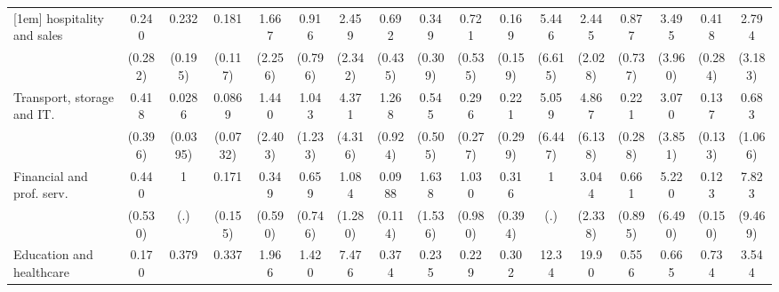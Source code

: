 {\begin{tabular}{l*{16}{c}}
[1em]
hospitality and sales&       0.240         &       0.232         &       0.181\sym{**} &       1.667         &       0.916         &       2.459         &       0.692         &       0.349         &       0.721         &       0.169         &       5.446         &       2.445         &       0.877         &       3.495         &       0.418         &       2.794         \\
                    &     (0.282)         &     (0.195)         &     (0.117)         &     (2.256)         &     (0.796)         &     (2.342)         &     (0.435)         &     (0.309)         &     (0.535)         &     (0.159)         &     (6.615)         &     (2.028)         &     (0.737)         &     (3.960)         &     (0.284)         &     (3.183)         \\
[1em]
Transport, storage and IT.&       0.418         &      0.0286\sym{*}  &      0.0869\sym{**} &       1.440         &       1.043         &       4.371         &       1.268         &       0.545         &       0.296         &       0.221         &       5.059         &       4.867         &       0.221         &       3.070         &       0.137\sym{*}  &       0.683         \\
                    &     (0.396)         &    (0.0395)         &    (0.0732)         &     (2.403)         &     (1.233)         &     (4.316)         &     (0.924)         &     (0.505)         &     (0.277)         &     (0.299)         &     (6.447)         &     (6.138)         &     (0.288)         &     (3.851)         &     (0.133)         &     (1.066)         \\
[1em]
Financial and prof. serv.&       0.440         &           1         &       0.171         &       0.349         &       0.659         &       1.084         &      0.0988\sym{*}  &       1.638         &       1.030         &       0.316         &           1         &       3.044         &       0.661         &       5.220         &       0.123         &       7.823         \\
                    &     (0.530)         &         (.)         &     (0.155)         &     (0.590)         &     (0.746)         &     (1.280)         &     (0.114)         &     (1.536)         &     (0.980)         &     (0.394)         &         (.)         &     (2.338)         &     (0.895)         &     (6.490)         &     (0.150)         &     (9.469)         \\
[1em]
Education and healthcare&       0.170         &       0.379         &       0.337         &       1.966         &       1.420         &       7.476\sym{*}  &       0.374         &       0.235         &       0.229         &       0.302         &       12.34\sym{*}  &       19.90\sym{**} &       0.556         &       0.665         &       0.734         &       3.544         \\

\end{tabular}}
